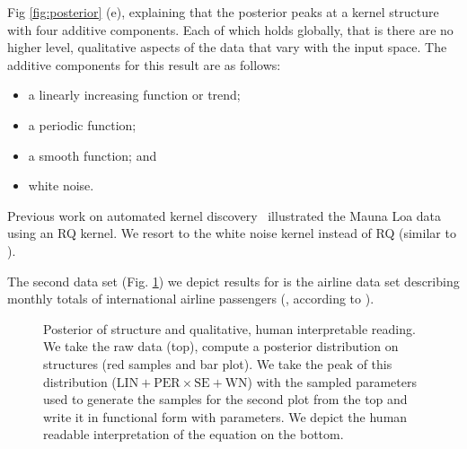 Fig \ref{fig:posterior} (e), explaining that 
the posterior peaks at a kernel structure with four additive components.
Each of which holds globally, that is there are no higher level, qualitative aspects
of the data that vary with the input space. The additive components for this result are as follows:
\begin{itemize}
\item a linearly increasing function or trend; 
\item a periodic function;
\item a smooth function; and
\item white noise.
\end{itemize}
 



Previous work on automated kernel discovery~\citep{duvenaud2013structure} illustrated the Mauna Loa data using an RQ kernel.
We resort to the white noise kernel instead of RQ (similar to \citep{lloyd2014automatic}).


The second data set (Fig. \ref{fig:posterior_airline}) we depict results for is  the airline 
data set describing monthly totals of international airline passengers (\citealp{box2011time}, according to \citealp{duvenaud2013structure}). 
\begin{figure}
\centering

\caption{\small Posterior of structure and qualitative, human interpretable reading. We take the raw data (top), compute a posterior distribution on structures (red samples and bar plot).
We take the peak of this distribution ($\text{LIN}+\text{PER} \times \text{SE}+\text{WN}$) with the sampled parameters used to generate the samples for the second plot from the top and write it in functional form with parameters. We depict the human readable interpretation of the equation on the bottom.}\label{fig:posterior_airline}
\end{figure}

